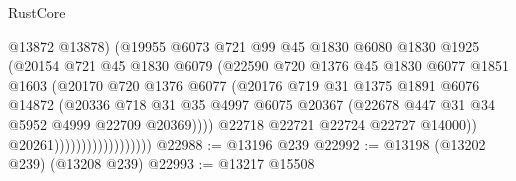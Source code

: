 \begin{lexlean}{RustCore}
\begin{coremodule}
                                        @13872
                                        @13878)
                                      (@19955
                                        @6073
                                        @721
                                        @99
                                        @45
                                        @1830
                                        @6080
                                        @1830
                                        @1925
                                        (@20154
                                          @721
                                          @45
                                          @1830
                                          @6079
                                          (@22590
                                            @720
                                            @1376
                                            @45
                                            @1830
                                            @6077
                                            @1851
                                            @1603
                                            (@20170
                                              @720
                                              @1376
                                              @6077
                                              (@20176
                                                @719
                                                @31
                                                @1375
                                                @1891
                                                @6076
                                                @14872
                                                (@20336
                                                  @718
                                                  @31
                                                  @35
                                                  @4997
                                                  @6075
                                                  @20367
                                                  (@22678 @447 @31 @34 @5952 @4999 @22709 @20369))))
                                            @22718
                                            @22721
                                            @22724
                                            @22727
                                            @14000))
                                        @20261))))))))))))))))))
@22988 := @13196 @239
@22992 := @13198 (@13202 @239) (@13208 @239)
@22993 := @13217 @15508

\end{coremodule}
\end{lexlean}

